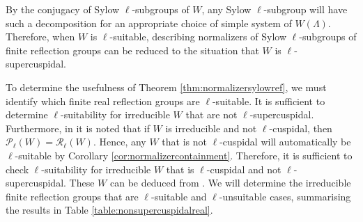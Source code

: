 \documentclass[12pt]{amsart}
\theoremstyle{plain}
\theoremstyle{definition}
\numberwithin{equation}{section}
\numberwithin{equation}{section}
\begin{document}
	By the conjugacy of Sylow $\ell$-subgroups of $W$, any Sylow $\ell$-subgroup will have such a decomposition for an appropriate choice of simple system of $W(\Lambda)$. Therefore, when $W$ is $\ell$-suitable, describing normalizers of Sylow $\ell$-subgroups of finite reflection groups can be reduced to the situation that $W$ is $\ell$-supercuspidal.
	
	To determine the usefulness of Theorem \ref{thm:normalizersylowref}, we must identify which finite real reflection groups are $\ell$-suitable. It is sufficient to determine $\ell$-suitability for irreducible $W$ that are not $\ell$-supercuspidal. Furthermore, in \cite[Observation 1.4]{METOO} it is noted that if $W$ is irreducible and not $\ell$-cuspidal, then $\mathcal{P}_\ell(W)=\mathcal{R}_{\ell}(W)$. Hence, any $W$ that is not $\ell$-cuspidal will automatically be $\ell$-suitable by Corollary \ref{cor:normalizercontainment}. Therefore, it is sufficient to check $\ell$-suitability for irreducible $W$ that is $\ell$-cuspidal and not $\ell$-supercuspidal. These $W$ can be deduced from \cite[Table 3]{ME}. We will determine the irreducible finite reflection groups that are $\ell$-suitable and $\ell$-unsuitable cases, summarising the results in Table \ref{table:nonsupercuspidalreal}. 
	
\end{document}
